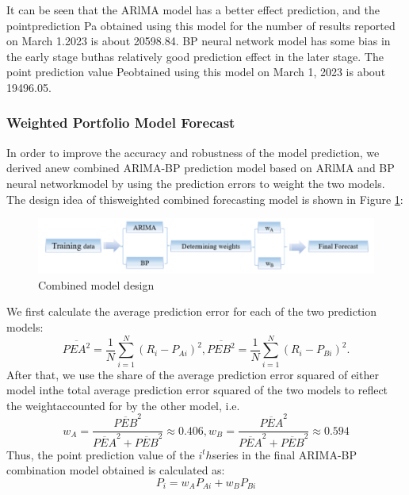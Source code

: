 \documentclass[12pt]{ctexart}
\begin{document}
It can be seen that the ARlMA model has a better effect prediction, and the pointprediction Pa obtained using this model for the number of results reported on March 1.2023 is about 20598.84. BP neural network model has some bias in the early stage buthas relatively good prediction effect in the later stage. The point prediction value Peobtained using this model on March 1, 2023 is about 19496.05.

\subsubsection{Weighted Portfolio Model Forecast}
In order to improve the accuracy and robustness of the model prediction, we derived anew combined ARlMA-BP prediction model based on ARlMA and BP neural networkmodel by using the prediction errors to weight the two models. The design idea of thisweighted combined forecasting model is shown in Figure \ref{fg:7}:
\begin{figure}[htbp]
	\centering
	\includegraphics[width=\textwidth]{1706018870335.png}
	\caption{Combined model design}
	\label{fg:7}
\end{figure}
We first calculate the average prediction error for each of the two prediction models:
\begin{equation*}
	\overline{PEA^2}=\frac{1}{N}\sum_{i=1}^{N}(R_i-P_{Ai})^2,\overline{PEB^2}=\frac{1}{N}\sum_{i=1}^{N}(R_i-P_{Bi})^2.
\end{equation*}
After that, we use the share of the average prediction error squared of either model inthe total average prediction error squared of the two models to reflect the weightaccounted for by the other model, i.e.
\begin{equation*}
	w_A=\frac{\overline{PEB}^2}{\overline{PEA}^2+\overline{PEB}^2}\approx0.406,  w_B=\frac{\overline{PEA}^2}{\overline{PEA}^2+\overline{PEB}^2}\approx0.594
\end{equation*} 
Thus, the point prediction value of the $i^th$series in the final ARIMA-BP combination model obtained is calculated as:
\begin{equation}
	P_i=w_{A}P_{Ai}+w_{B}P_{Bi}\label{eq:1}
\end{equation}
\end{document}
